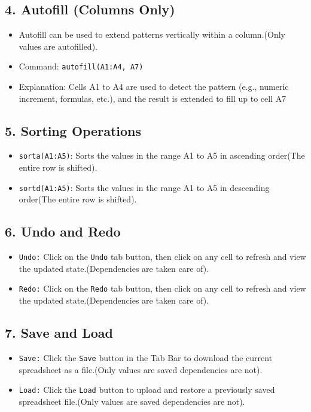 \documentclass{article}
\begin{document}
\subsection*{4. Autofill (Columns Only)}
\begin{itemize}
    \item Autofill can be used to extend patterns vertically within a column.(Only values are autofilled).
    \item Command: \texttt{autofill(A1:A4, A7)}
    \item Explanation: Cells A1 to A4 are used to detect the pattern (e.g., numeric increment, formulas, etc.), and the result is extended to fill up to cell A7
\end{itemize}

\subsection*{5. Sorting Operations}
\begin{itemize}
    \item \texttt{sorta(A1:A5)}: Sorts the values in the range A1 to A5 in ascending order(The entire row is shifted).
    \item \texttt{sortd(A1:A5)}: Sorts the values in the range A1 to A5 in descending order(The entire row is shifted).
\end{itemize}

\subsection*{6. Undo and Redo}
\begin{itemize}
    \item \texttt{Undo:} Click on the \texttt{Undo} tab button, then click on any cell to refresh and view the updated state.(Dependencies are taken care of).
    \item \texttt{Redo:} Click on the \texttt{Redo} tab button, then click on any cell to refresh and view the updated state.(Dependencies are taken care of).
\end{itemize}

\subsection*{7. Save and Load}
\begin{itemize}
    \item \texttt{Save:} Click the \texttt{Save} button in the Tab Bar to download the current spreadsheet as a file.(Only values are saved dependencies are not).
    \item \texttt{Load:} Click the \texttt{Load} button to upload and restore a previously saved spreadsheet file.(Only values are saved dependencies are not).
\end{itemize}
\end{document}
